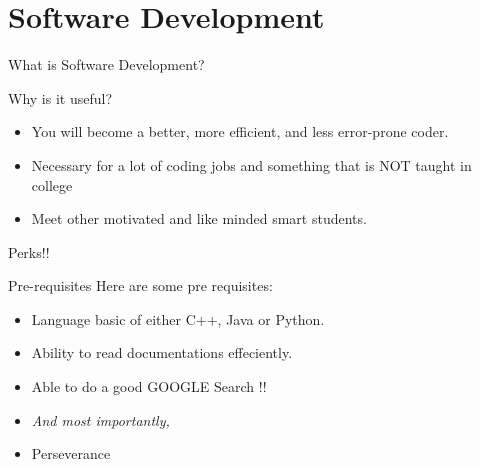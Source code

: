 \section{Software Development}
    \begin{frame}{What is Software Development?}
        
    \end{frame}
    \begin{frame}{Why is it useful?}
        \begin{itemize}
            \item<+-> You will become a better, more efficient, and less error-prone coder.
            \item<+-> Necessary for a lot of coding jobs and something that is NOT taught in college            
            \item<+-> Meet other motivated and like minded smart students.
        \end{itemize}
    \end{frame}
    \begin{frame}{Perks!!}
        \vspace{20px}
        \vspace{20px}        
        
    \end{frame}
    \begin{frame}{Pre-requisites}
        Here are some pre requisites:
        \pause
        \begin{itemize}
            \item<+-> Language basic of either C++, Java or Python.
            \item<+-> Ability to read documentations effeciently.
            \item<+-> Able to do a good GOOGLE Search !!            
            \item<+->[] \textit{And most importantly,}
            \item<+-> Perseverance
        \end{itemize}
    \end{frame}

